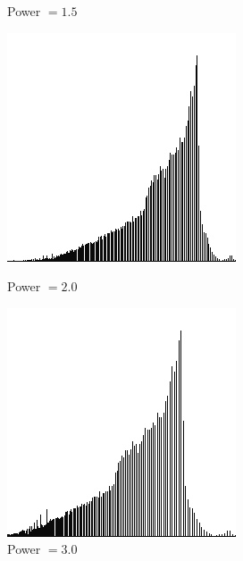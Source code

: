 \documentclass[12pt,a4paper,notitlepage,oneside,amsmath,amssymb]{article}
\begin{document}
\begin{CJK*}{UTF8}{bkai}
\begin{enumerate}[label=(\alph*)]
\begin{figure}[hbt!]
\begin{minipage}{.25\textwidth}
              \caption*{Power \(= 1.5\)}
            \end{minipage}%
            \begin{minipage}{.25\textwidth}
              \centering
              \includegraphics[width=.95\linewidth]{imageC-2_hist}
              \caption*{Power \(= 2.0\)}
            \end{minipage}%
            \begin{minipage}{.25\textwidth}
              \centering
              \includegraphics[width=.95\linewidth]{imageC-3_hist}
              \caption*{Power \(= 3.0\)}
            \end{minipage}
          \end{figure}
  \end{enumerate}


\end{CJK*}
\end{document}
